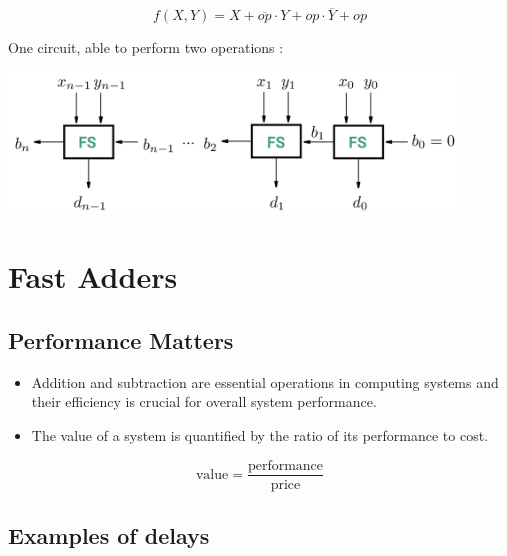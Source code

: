 \documentclass[12pt,openany, tikz,border=10pt]{book}
\begin{document}
  \[
  f(X, Y) = X + \overline{op} \cdot Y + op \cdot \overline{Y} + op
  \]

  \vspace*{10px}

  One circuit, able to perform two operations :
  \begin{center}
    \begin{minipage}[c]{0.90\textwidth} %
        \centering
        \includegraphics[width=0.90\textwidth]{circuits/8.2.5.png} %
    \end{minipage}
    \end{center}

\section{Fast Adders}
\subsection{Performance Matters}
\begin{itemize}
  \item[] Addition and subtraction are essential operations in computing systems and their efficiency is crucial for overall system performance.
  \item[] The value of a system is quantified by the ratio of its performance to cost.
\end{itemize}
\[
\text{value} = \frac{\text{performance}}{\text{price}}
\]
\subsection{Examples of delays}
\end{document}
